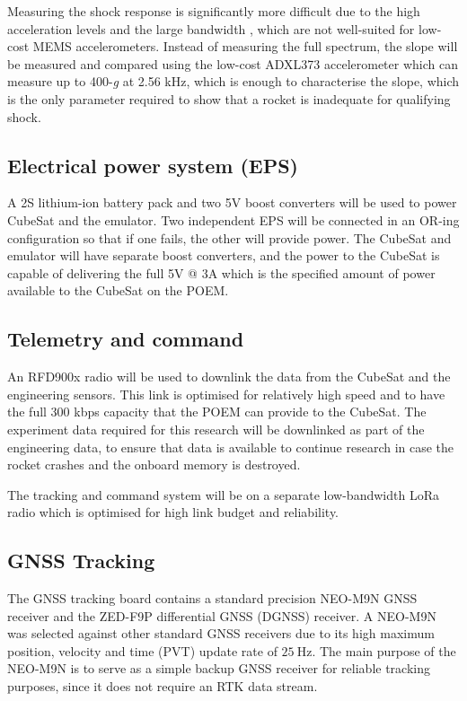 \documentclass[a4paper,11pt]{article}
\begin{document}
Measuring the shock response is significantly more difficult due to the high acceleration levels and the large bandwidth \cite{nasa-pyroshock}, which are not well-suited for low-cost MEMS accelerometers. Instead of measuring the full spectrum, the slope will be measured and compared using the low-cost ADXL373 accelerometer which can measure up to 400-\textit{g} at 2.56 kHz, which is enough to characterise the slope, which is the only parameter required to show that a rocket is inadequate for qualifying shock.


\subsection{Electrical power system (EPS)}
A 2S lithium-ion battery pack and two 5V boost converters will be used to power CubeSat and the emulator. Two independent EPS will be connected in an OR-ing configuration so that if one fails, the other will provide power. The CubeSat and emulator will have separate boost converters, and the power to the CubeSat is capable of delivering the full 5V @ 3A which is the specified amount of power available to the CubeSat on the POEM.

\subsection{Telemetry and command}
An RFD900x radio will be used to downlink the data from the CubeSat and the engineering sensors. This link is optimised for relatively high speed and to have the full 300 kbps capacity that the POEM can provide to the CubeSat. The experiment data required for this research will be downlinked as part of the engineering data, to ensure that data is available to continue research in case the rocket crashes and the onboard memory is destroyed.

The tracking and command system will be on a separate low-bandwidth LoRa radio which is optimised for high link budget and reliability.


\subsection{GNSS Tracking}

The GNSS tracking board contains a standard precision NEO-M9N GNSS receiver and the ZED-F9P differential GNSS (DGNSS) receiver. A NEO-M9N was selected against other standard GNSS receivers due to its high maximum position, velocity and time (PVT) update rate of $\SI{25}{\hertz}$. The main purpose of the NEO-M9N is to serve as a simple backup GNSS receiver for reliable tracking purposes, since it does not require an RTK data stream.
\end{document}

